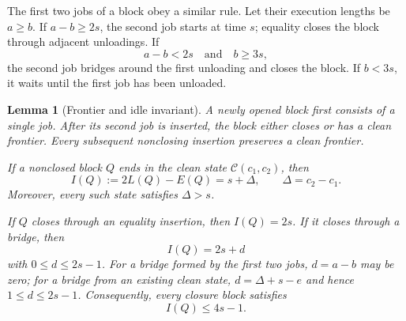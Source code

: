\documentclass[11pt]{article}
\newtheorem{lemma}{Lemma}
\begin{document}
The first two jobs of a block obey a similar rule. Let their execution lengths
be \(a\ge b\). If \(a-b\ge2s\), the second job starts at time \(s\); equality
closes the block through adjacent unloadings. If
\[
a-b<2s
\quad\text{and}\quad
b\ge3s,
\]
the second job bridges around the first unloading and closes the block. If
\(b<3s\), it waits until the first job has been unloaded.

\begin{lemma}[Frontier and idle invariant]
\label{lem:lpt-frontier-invariant}
A newly opened block first consists of a single job. After its second job is
inserted, the block either closes or has a clean frontier. Every subsequent
nonclosing insertion preserves a clean frontier.

If a nonclosed block \(Q\) ends in the clean state
\(\mathcal C(c_1,c_2)\), then
\begin{equation}
I(Q):=2L(Q)-E(Q)=s+\Delta,
\qquad
\Delta=c_2-c_1.
\label{eq:lpt-clean-idle}
\end{equation}
Moreover, every such state satisfies \(\Delta>s\).

If \(Q\) closes through an equality insertion, then \(I(Q)=2s\). If it
closes through a bridge, then
\[
I(Q)=2s+d
\]
with \(0\le d\le2s-1\). For a bridge formed by the first two jobs,
\(d=a-b\) may be zero; for a bridge from an existing clean state,
\(d=\Delta+s-e\) and hence \(1\le d\le2s-1\). Consequently, every closure
block satisfies
\begin{equation}
I(Q)\le4s-1.
\label{eq:lpt-closure-idle}
\end{equation}
\end{lemma}
\end{document}
